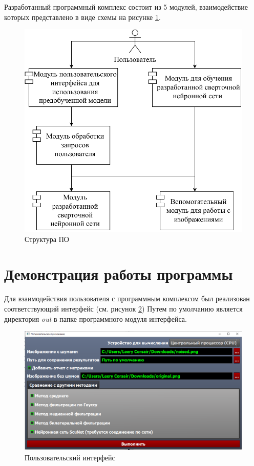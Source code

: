 Разработанный программный комплекс состоит из 5 модулей, взаимодействие которых представлено в виде схемы на рисунке \ref{fig:prog_struct}.

\begin{figure}[h!btp]
	\centering
	\includegraphics[]{inc/design/prog_struct.pdf}
	\caption{Структура ПО}
	\label{fig:prog_struct}	
\end{figure}

\section{Демонстрация работы программы}

Для взаимодействия пользователя с программным комплексом был реализован соответствующий интерфейс (см. рисунок \ref{fig:interface}) Путем по умолчанию является директория \textit{out} в папке программного модуля интерфейса.

\begin{figure}[h!btp]
	\centering
	\includegraphics[scale = 0.5]{inc/demo/interface.png}
	\caption{Пользовательский интерфейс}
	\label{fig:interface}	
\end{figure}

